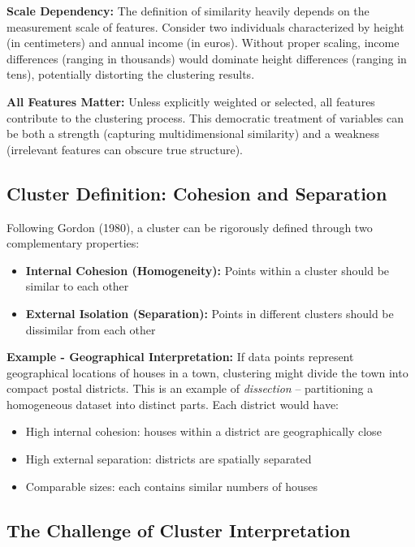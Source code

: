 \documentclass[11pt]{article}
\begin{document}
\textbf{Scale Dependency:} The definition of similarity heavily depends on the measurement scale of features. Consider two individuals characterized by height (in centimeters) and annual income (in euros). Without proper scaling, income differences (ranging in thousands) would dominate height differences (ranging in tens), potentially distorting the clustering results.

\textbf{All Features Matter:} Unless explicitly weighted or selected, all features contribute to the clustering process. This democratic treatment of variables can be both a strength (capturing multidimensional similarity) and a weakness (irrelevant features can obscure true structure).

\subsection{Cluster Definition: Cohesion and Separation}

Following Gordon (1980), a cluster can be rigorously defined through two complementary properties:

\begin{itemize}
    \item \textbf{Internal Cohesion (Homogeneity):} Points within a cluster should be similar to each other
    \item \textbf{External Isolation (Separation):} Points in different clusters should be dissimilar from each other
\end{itemize}

\textbf{Example - Geographical Interpretation:} If data points represent geographical locations of houses in a town, clustering might divide the town into compact postal districts. This is an example of \textit{dissection} -- partitioning a homogeneous dataset into distinct parts. Each district would have:
\begin{itemize}
    \item High internal cohesion: houses within a district are geographically close
    \item High external separation: districts are spatially separated
    \item Comparable sizes: each contains similar numbers of houses
\end{itemize}

\subsection{The Challenge of Cluster Interpretation}
\end{document}

